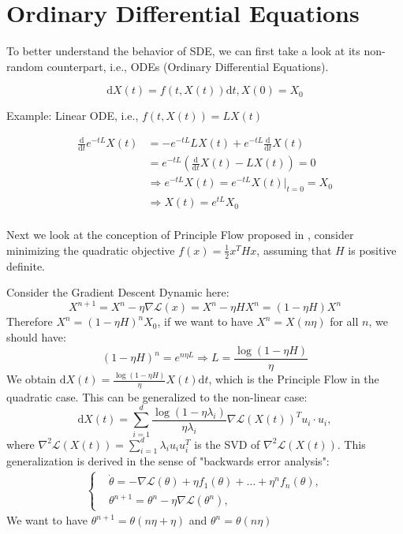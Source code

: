\section{Ordinary Differential Equations}
To better understand the behavior of SDE, we can first take a look at its non-random counterpart, i.e., ODEs (Ordinary Differential Equations).


\begin{equation}
    \mathrm{d}X(t) = f(t,X(t)) \mathrm{d}t,X(0)=X_0\tag{ODE}
    \label{ODE}
\end{equation}

Example: Linear ODE, i.e., $ f(t,X(t)) = L X(t)$

\begin{equation}
    \begin{aligned}
        \frac{\mathrm{d}}{\mathrm{d}t}e^{-tL}X(t)
        &=-e^{-tL}LX(t)+e^{-tL}\frac{\mathrm{d}}{\mathrm{d}t}X(t)\\
       &=e^{-tL}\left( \frac{\mathrm{d}}{\mathrm{d}t}X(t)-LX(t) \right) =0\\
       &\Rightarrow e^{-tL}X(t)=e^{-tL}X(t)\vert_{t=0} =X_0\\
       &\Rightarrow X(t) = e^{tL}X_0\\
    \end{aligned}
\end{equation}

Next we look at the conception of Principle Flow proposed in \citet{rosca2023on}, consider minimizing the quadratic objective $f(x) = \frac{1}{2}x^THx$, assuming that $H$ is positive definite.

Consider the Gradient Descent Dynamic here:
$$
X^{n+1} = X^n-\eta\nabla\mathcal{L}(x) = X^n - \eta H X^n = (1-\eta H)X^n
$$
Therefore $X^{n} = (1-\eta H)^nX_0$, if we want to have $X^n = X(n\eta)$ for all $n$, we should have:
$$
(1-\eta H)^n = e^{n\eta L}\Rightarrow L = \frac{\log (1-\eta H)}{\eta}
$$
We obtain $\mathrm{d}X(t) = \frac{\log(1-\eta H)}{\eta}X(t)\mathrm{d}t$, which is the Principle Flow in the quadratic case. This can be generalized to the non-linear case:
$$
\mathrm{d}X(t) = \sum_{i = 1}^{d}  \frac{\log(1-\eta\lambda_i)}{\eta \lambda_i}\nabla\mathcal{L}(X(t))^T u_i\cdot u_i,
$$
where $\nabla^2\mathcal{L}(X(t)) = \sum_{i = 1}^{d}  \lambda_i u_iu_i^T$ is the SVD of $\nabla^2\mathcal{L}(X(t))$.
This generalization is derived in the sense of "backwards error analysis":
\begin{align}\label{backward error analysis}
    \left\{
     \begin{aligned}
         &\dot{\theta} = - \nabla\mathcal{L}(\theta) + \eta f_1(\theta) + \dots  + \eta ^nf_n(\theta) , \\
         &\theta^{n+1} = \theta^n -\eta \nabla\mathcal{L}(\theta^n), 
     \end{aligned}\right.
 \end{align}
We want to have $\theta^{n+1} = \theta(n\eta+\eta)$ and $\theta^n = \theta(n\eta)$


